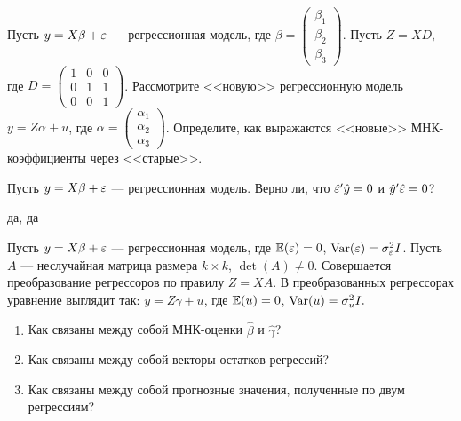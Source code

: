 \documentclass[pdftex,11pt,openany]{book}\usepackage[]{graphicx}\usepackage[]{color}
\begin{document}
\begin{problem}
Пусть $y = X\beta + \varepsilon$ --- регрессионная модель, где $\beta = \begin{pmatrix} \beta_1 \\ \beta_2 \\ \beta_3 \end{pmatrix}$. Пусть $Z = XD$, где $D = \begin{pmatrix} 1 & 0 & 0 \\ 0 & 1 & 1 \\ 0 & 0 & 1 \end{pmatrix}$. Рассмотрите <<новую>> регрессионную модель $y = Z\alpha + u$, где $\alpha = \begin{pmatrix} \alpha_1 \\ \alpha_2 \\ \alpha_3 \end{pmatrix}$. Определите, как выражаются <<новые>> МНК-коэффициенты через <<старые>>.


\end{problem}

\begin{solution}
\end{solution}


\begin{problem}
Пусть $y = X\beta + \varepsilon$ --- регрессионная модель. Верно ли, что $\hat{\varepsilon}'\hat{y}=0$ и $\hat{y}'\hat{\varepsilon}=0$?
\end{problem}
\begin{solution}
да, да
\end{solution}

\begin{problem}
Пусть $y = X\beta + \varepsilon$ --- регрессионная модель, где $\mathbb{E}(\varepsilon)=0$, $\operatorname{Var}(\varepsilon)=\sigma_{\varepsilon}^2 I$. Пусть $A$ --- неслучайная матрица размера $k \times k$, $\det(A) \not= 0.$ Совершается преобразование регрессоров по правилу $Z=XA$. В преобразованных регрессорах уравнение выглядит так: $y = Z\gamma + u$, где $\mathbb{E}(u)=0$, $\operatorname{Var}(u)=\sigma_{u}^2 I.$

\begin{enumerate}
\item Как связаны между собой МНК-оценки $\hat{\beta}$ и $\hat{\gamma}$?
\item Как связаны между собой векторы остатков регрессий?
\item Как связаны между собой прогнозные значения, полученные по двум регрессиям?
\end{enumerate}
\end{problem}
\end{document}
